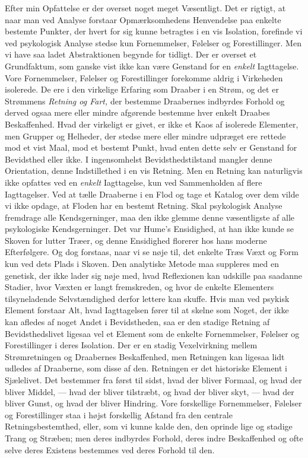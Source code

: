 \documentclass[12pt,a4paper,openany]{book}
\newcommand{\opage}[1]{\marginnote{\footnotesize\textit{[#1]}}}
\begin{document}
Efter min Opfattelse er der overset noget meget Væsentligt.
Det er rigtigt, at naar man ved Analyse forstaar Opmærksomhedens
Henvendelse paa enkelte bestemte Punkter, der hvert
for sig kunne betragtes i en vis Isolation, forefinde vi ved
psykologisk Analyse stedse kun Fornemmelser, Følelser og
Forestillinger. Men vi have saa ladet Abstraktionen begynde
for tidligt. Der er overset et Grundfaktum, som ganske vist
ikke kan være Genstand for en \textit{enkelt} Iagttagelse. Vore Fornemmelser,
Følelser og Forestillinger forekomme aldrig i Virkeheden
isolerede. De ere i den virkelige Erfaring som Draaber
\setcounter{footnote}{0}%
\opage{30}i en Strøm, og det er Strømmens \textit{Retning og Fart,} der bestemme
Draabernes indbyrdes Forhold og derved ogsaa mere
eller mindre afgørende bestemme hver enkelt Draabes Beskaffenhed.
Hvad der virkeligt er givet, er ikke et Kaos af
isolerede Elementer, men Grupper og Helheder, der stedse
mere eller mindre udpræget ere rettede mod et vist Maal, mod
et bestemt Punkt, hvad enten dette selv er Genstand for Bevidsthed
eller ikke. I ingensomhelst Bevidsthedstilstand mangler
denne Orientation, denne Indstillethed i en vis Retning. Men
en Retning kan naturligvis ikke opfattes ved en \textit{enkelt} Iagttagelse,
kun ved Sammenholden af flere Iagttagelser. Ved at
tælle Draaberne i en Flod og tage et Katalog over dem vilde
vi ikke opdage, at Floden har en bestemt Retning. Skal psykologisk
Analyse fremdrage alle Kendsgerninger, maa den ikke
glemme denne væsentligste af alle psykologiske Kendsgerninger.
Det var Hume’s Ensidighed, at han ikke kunde se Skoven for
lutter Træer, og denne Ensidighed florerer hos hans moderne
Efterfølgere. Og dog forstaas, naar vi se nøje til, det enkelte
Træs Væxt og Form kun ved dets Plads i Skoven. Den analytiske
Metode maa suppleres med en genetisk, der ikke lader
sig nøje med, hvad Reflexionen kan udskille paa saadanne
Stadier, hvor Væxten er langt fremskreden, og hvor de enkelte
Elementers tilsyneladende Selvstændighed derfor lettere kan
skuffe. Hvis man ved psykisk Element forstaar Alt, hvad Iagttagelsen
fører til at skelne som Noget, der ikke kan afledes af
noget Andet i Bevidstheden, saa er den stadige Retning af
Bevidsthedslivet ligesaa vel et Element som de enkelte Fornemmelser,
Følelser og Forestillinger i deres Isolation. Der er
en stadig Vexelvirkning mellem Strømretningen og Draabernes
Beskaffenhed, men Retningen kan ligesaa lidt udledes af Draaberne,
som disse af den. Retningen er det historiske Element
i Sjælelivet. Det bestemmer fra først til sidst, hvad der bliver
Formaal, og hvad der bliver Middel, --- hvad der bliver tilstræbt,
og hvad der bliver skyt, --- hvad der bliver Gunst, og hvad
der bliver Hindring. Vore forskellige Fornemmelser, Følelser
og Forestillinger staa i højst forskellig Afstand fra den centrale
Retningsbestemthed, eller, som vi kunne kalde den, den oprinde%
\setcounter{footnote}{0}%
\opage{31}lige og stadige Trang og Stræben; men deres indbyrdes Forhold,
deres indre Beskaffenhed og ofte selve deres Existens
bestemmes ved deres Forhold til den.
\end{document}
